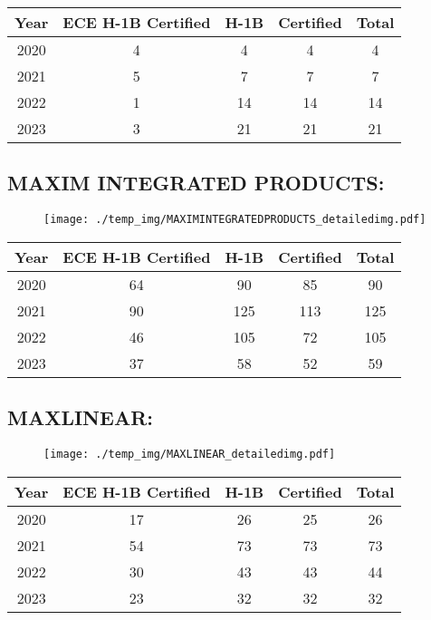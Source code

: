 \documentclass{article}%
\begin{document}
%
\begin{longtable}{c|c|c|c|c}%
\hline%
Year&ECE H{-}1B Certified&H{-}1B&Certified&Total\\%
\hline%
2020&4&4&4&4\\%
\hline%
2021&5&7&7&7\\%
\hline%
2022&1&14&14&14\\%
\hline%
2023&3&21&21&21\\%
\hline%
\end{longtable}

%
\newpage%
\subsection{MAXIM INTEGRATED PRODUCTS:}%
\label{subsec:MAXIMINTEGRATEDPRODUCTS}%
\label{MAXIMINTEGRATEDPRODUCTSdetailed}%


\begin{figure}[htbp]%
\centering%
\texttt{[image: ./temp\_img/MAXIMINTEGRATEDPRODUCTS\_detailedimg.pdf]}%
\end{figure}

%
\begin{longtable}{c|c|c|c|c}%
\hline%
Year&ECE H{-}1B Certified&H{-}1B&Certified&Total\\%
\hline%
2020&64&90&85&90\\%
\hline%
2021&90&125&113&125\\%
\hline%
2022&46&105&72&105\\%
\hline%
2023&37&58&52&59\\%
\hline%
\end{longtable}

%
\newpage%
\subsection{MAXLINEAR:}%
\label{subsec:MAXLINEAR}%
\label{MAXLINEARdetailed}%


\begin{figure}[htbp]%
\centering%
\texttt{[image: ./temp\_img/MAXLINEAR\_detailedimg.pdf]}%
\end{figure}

%
\begin{longtable}{c|c|c|c|c}%
\hline%
Year&ECE H{-}1B Certified&H{-}1B&Certified&Total\\%
\hline%
2020&17&26&25&26\\%
\hline%
2021&54&73&73&73\\%
\hline%
2022&30&43&43&44\\%
\hline%
2023&23&32&32&32\\%
\hline%
\end{longtable}
\end{document}
